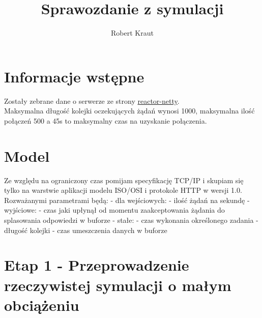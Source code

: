 \documentclass{article}
\title{Sprawozdanie z symulacji}
\author{Robert Kraut}
\begin{document}
    \maketitle
    \section{Informacje wstępne}
    Zostały zebrane dane o serwerze ze strony \href{https://projectreactor.io/docs/netty/release/reference/index.html}{reactor-netty}. \\
    Maksymalna długość kolejki oczekujących żądań wynosi 1000, maksymalna ilość połączeń 500 a 45s\newline
    to maksymalny czas na uzyskanie połączenia.
    \section{Model}
    Ze względu na ograniczony czas pomijam specyfikację TCP/IP i skupiam się tylko na warstwie aplikacji \newline
    modelu ISO/OSI i protokole HTTP w wersji 1.0.\newline
    Rozważanymi parametrami będą:
    - dla wejściowych:
        - ilość żądań na sekundę
    - wyjściowe:
        - czas jaki upłynął od momentu zaakceptowania żądania do splasowania odpowiedzi w buforze
    - stałe:
        - czas wykonania określonego zadania
        - długość kolejki
        - czas umeszczenia danych w buforze
    \section{Etap 1 - Przeprowadzenie rzeczywistej symulacji o małym obciążeniu}
\end{document}
